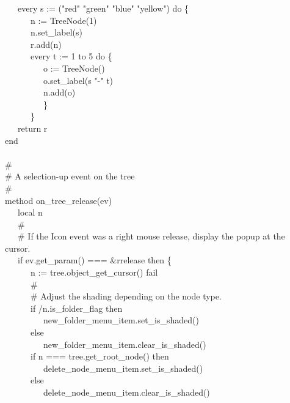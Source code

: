 {\>   \ \ \ every s := ("red" {\textbar}
"green" {\textbar}
"blue" {\textbar}
"yellow") do \{ \\
\>   \ \ \ \ \ \ n := TreeNode(1) \\
\>   \ \ \ \ \ \ n.set\_label(s) \\
\>   \ \ \ \ \ \ r.add(n) \\
\>   \ \ \ \ \ \ every t := 1 to 5 do \{ \\
\>   \ \ \ \ \ \ \ \ \ o := TreeNode() \\
\>   \ \ \ \ \ \ \ \ \ o.set\_label(s {\textbar}{\textbar}
"-" {\textbar}{\textbar}t) \\
\>   \ \ \ \ \ \ \ \ \ n.add(o) \\
\>   \ \ \ \ \ \ \ \ \ \} \\
\>   \ \ \ \ \ \ \} \\
\>   \ \ \ return r \\
\>   end \\
\ \\
\>   \# \\
\>   \# A selection-up event on the tree \\
\>   \# \\
\>   method on\_tree\_release(ev) \\
\>   \ \ \ local n \\
\>   \ \ \ \# \\
\>   \ \ \ \# If the Icon event was a right mouse release, display the popup at the cursor. \\
\>   \ \ \ if ev.get\_param() === \&rrelease then \{ \\
\>   \ \ \ \ \ \ n := tree.object\_get\_cursor() {\textbar} fail \\
\>   \ \ \ \ \ \ \# \\
\>   \ \ \ \ \ \ \# Adjust the shading depending on the node type. \\
\>   \ \ \ \ \ \ if /n.is\_folder\_flag then \\
\>   \ \ \ \ \ \ \ \ \ new\_folder\_menu\_item.set\_is\_shaded() \\
\>   \ \ \ \ \ \ else \\
\>   \ \ \ \ \ \ \ \ \ new\_folder\_menu\_item.clear\_is\_shaded() \\
\>   \ \ \ \ \ \ if n === tree.get\_root\_node() then \\
\>   \ \ \ \ \ \ \ \ \ delete\_node\_menu\_item.set\_is\_shaded() \\
\>   \ \ \ \ \ \ else \\
\>   \ \ \ \ \ \ \ \ \ delete\_node\_menu\_item.clear\_is\_shaded() \\
}
